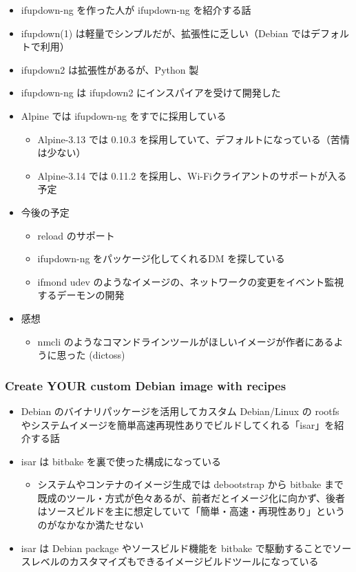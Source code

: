 \documentclass[mingoth,a4paper]{jsarticle}
\begin{document}
\begin{itemize}
\item ifupdown-ng を作った人が ifupdown-ng を紹介する話
\item ifupdown(1) は軽量でシンプルだが、拡張性に乏しい（Debian ではデフォルトで利用）
\item ifupdown2 は拡張性があるが、Python 製
\item ifupdown-ng は ifupdown2 にインスパイアを受けて開発した
\item Alpine では ifupdown-ng をすでに採用している
  \begin{itemize}
  \item Alpine-3.13 では 0.10.3 を採用していて、デフォルトになっている（苦情は少ない）
  \item Alpine-3.14 では 0.11.2 を採用し、Wi-Fiクライアントのサポートが入る予定
  \end{itemize}
\item 今後の予定
  \begin{itemize}
  \item reload のサポート
  \item ifupdown-ng をパッケージ化してくれるDM を探している
  \item ifmond udev のようなイメージの、ネットワークの変更をイベント監視するデーモンの開発
  \end{itemize}
\item 感想
  \begin{itemize}
  \item nmcli のようなコマンドラインツールがほしいイメージが作者にあるように思った (dictoss)
  \end{itemize}
\end{itemize}

\subsubsection{Create YOUR custom Debian image with recipes}

\begin{itemize}
\item Debian のバイナリパッケージを活用してカスタム Debian/Linux の rootfs やシステムイメージを簡単高速再現性ありでビルドしてくれる「isar」を紹介する話
\item isar は bitbake を裏で使った構成になっている
  \begin{itemize}
  \item システムやコンテナのイメージ生成では debootstrap から bitbake まで既成のツール・方式が色々あるが、前者だとイメージ化に向かず、後者はソースビルドを主に想定していて「簡単・高速・再現性あり」というのがなかなか満たせない
  \end{itemize}
\item isar は Debian package やソースビルド機能を bitbake で駆動することでソースレベルのカスタマイズもできるイメージビルドツールになっている
\end{itemize}
\end{document}

